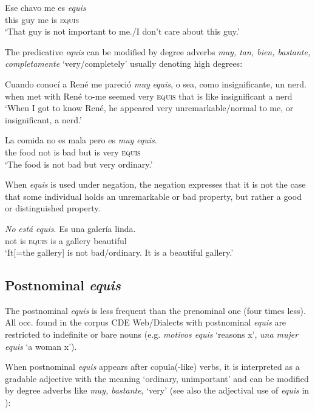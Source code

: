 \documentclass[output=paper
,modfonts
,nonflat]{langsci/langscibook}
\begin{document}
\ea
\gll  Ese chavo me es \textit{equis}\\
this guy me is \textsc{equis}\\
\glt ‘That guy is not important to me./I don’t care about this guy.’
\z

The predicative \textit{equis} can be modified by degree adverbs \textit{muy, tan, bien, bastante, completamente} ‘very/completely’ usually denoting high degrees:

\ea
\gll Cuando conocí a René me pareció \textit{muy} \textit{equis}, o sea, como insignificante, un nerd.\\
when met with René to-me seemed very \textsc{equis} that is like insignificant a nerd\\
\glt ‘When I got to know René, he appeared very unremarkable/normal to me, or insignificant, a nerd.’
\z

\ea
\gll La comida no es mala pero es \textit{muy} \textit{equis}.\\
the food not is bad but is very \textsc{equis}\\
\glt ‘The food is not bad but very ordinary.’
\z

When \textit{equis} is used under negation, the negation expresses that it is not the case that some individual holds an unremarkable or bad property, but rather a good or distinguished property. 

\ea
\gll \textit{No} \textit{está} \textit{equis}. Es una galería linda.\\
not is \textsc{equis} is a gallery beautiful\\
\glt ‘It[=the gallery] is not bad/ordinary. It is a beautiful gallery.’
\z

\subsection{Postnominal \textit{equis}}\label{sec:kellert:2.3}
The postnominal \textit{equis} is less frequent than the prenominal one (four times less). All occ. found in the corpus CDE Web/Dialects with postnominal \textit{equis} are restricted to indefinite or bare nouns (e.g.  \textit{motivos equis} ‘reasons x’, \textit{una mujer equis} ‘a woman x’). 

When postnominal \textit{equis} appears after copula(-like) verbs, it is interpreted as a gradable adjective with the meaning ‘ordinary, unimportant’ and can be modified by degree adverbs like \textit{muy, bastante}, ‘very’ (see also the adjectival use of \textit{equis} in ):
\end{document}
